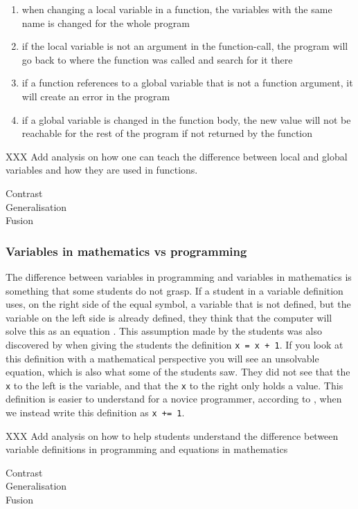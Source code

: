 \begin{enumerate}
    \item when changing a local variable in a function, the variables with 
the same name is changed for the whole program

    \item if the local variable is not an argument in the function-call, 
the program will go back to where the function was called and search 
for it there

    \item if a function references to a global variable that is not a 
function argument, it will create an error in the program

    \item if a global variable is changed in the function body, the new 
value will not be reachable for the rest of the program if not returned 
by the function
\end{enumerate}

XXX Add analysis on how one can teach the difference between local and 
global variables and how they are used in functions. 

\begin{description}
    \item[Contrast]
    \item[Generalisation]
    \item[Fusion]
\end{description}

\subsubsection{Variables in mathematics vs programming}

The difference between variables in programming and variables in 
mathematics is something that some students do not grasp. If a student in a 
variable 
definition uses, on the right side of the equal symbol, a variable that is 
not 
defined, but the variable on the left side is already defined, they think 
that 
the computer will solve this as an equation \parencite{Plass2015Variables}. 
This assumption made by the students was also discovered by 
\textcite{Kohn2017VariableEvaluation} when giving the students the 
definition 
\texttt{x = x + 1}. If you look at this definition with a 
mathematical 
perspective you will see an unsolvable equation, which is also what some of 
the 
students saw. They did not see that the \texttt{x} to the left 
is the 
variable, 
and that the \texttt{x} to the right only holds a value. This 
definition is  
easier to understand for a novice programmer, according to 
\textcite{Kohn2017VariableEvaluation}, when we instead write this 
definition as 
\texttt{x += 1}. 

XXX Add analysis on how to help students understand the difference between 
variable definitions in programming and equations in mathematics

\begin{description}
    \item[Contrast]
    \item[Generalisation]
    \item[Fusion]
\end{description}




